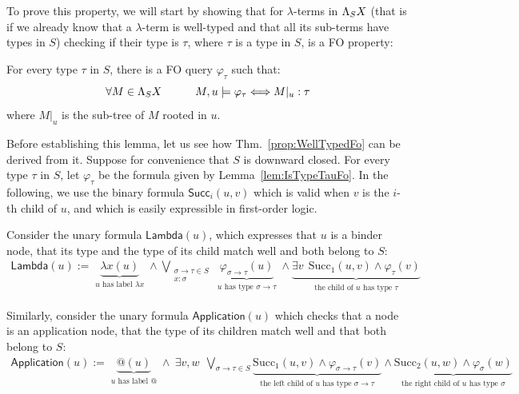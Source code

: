 To prove this property, we will start by showing that for $\lambda$-terms in $\Lambda_{S} X$ (that is if we already know that a $\lambda$-term is well-typed and that all its sub-terms have types in $S$) checking if their type is $\tau$, where $\tau$ is a type in $S$, is a FO property:
\begin{lemma}\label{lem:IsTypeTauFo}
For every type $\tau$ in $S$, there is a FO query $\varphi_\tau$ such that:
$$ \forall M\in \Lambda_{S} X \qquad\quad M,u \models \varphi_\tau \Longleftrightarrow M|_u:\tau$$
where $M|_u$ is the sub-tree of $M$ rooted in $u$. 
\end{lemma}
Before establishing this lemma, let us see how Thm.~\ref{prop:WellTypedFo} can be derived from it. Suppose for convenience that $S$ is downward closed. For every type $\tau$ in $S$, let $\varphi_\tau$ be the formula given by Lemma~\ref{lem:IsTypeTauFo}. In the following, we use the binary formula
 $\mathsf{Succ}_{i}(u,v)$ which is valid when $v$ is the $i$-th child of $u$, and which is easily expressible in first-order logic.
 \smallskip
 
Consider the unary formula $\mathsf{Lambda}(u)$, which expresses that $u$ is a binder node, that its type and the type of its child match well and both belong to $S$: 
\begin{align*}
\mathsf{Lambda}(u) := \underbrace{\lambda x(u)}_{\substack{\text{$u$ has label $\lambda x$}}} \wedge\bigvee_{\substack{\sigma\rightarrow\tau \in S\\x:\sigma}}  \underbrace{\varphi_{\sigma\rightarrow\tau}(u)}_{\substack{\text{$u$ has type $\sigma\rightarrow\tau$}}}  \wedge \underbrace{\exists v\ \ \mathrm{Succ}_1(u, v) \wedge \varphi_\tau (v)}_{\substack{\text{the child of $u$ has type $\tau$}}}
\end{align*}

Similarly, consider the unary formula $\mathsf{Application}(u)$ which checks that a node is an application node, that the type of its children match well and that both belong to $S$: 
\begin{align*}
\mathsf{Application}(u) := \underbrace{@(u)}_{\substack{\text{$u$ has label @}}}  \wedge \ \exists v, w\ \ \bigvee_{\sigma\rightarrow\tau \in S}  \underbrace{\mathrm{Succ}_1(u, v) \wedge \varphi_{\sigma\rightarrow\tau} (v)}_{\substack{\text{the left child of $u$ has type $\sigma\rightarrow\tau$}}} \wedge \underbrace{\mathrm{Succ}_2(u, w) \wedge \varphi_{\sigma} (w)}_{\substack{\text{the right child of $u$ has type $\sigma$}}}
\end{align*}

